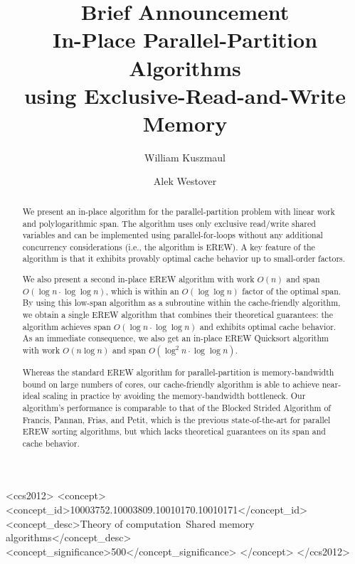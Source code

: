 \documentclass[sigconf]{acmart}
\theoremstyle{remark}
\theoremstyle{remark}
\begin{document}
\fancyhead{}


\title{Brief Announcement \\In-Place Parallel-Partition Algorithms \\using Exclusive-Read-and-Write Memory}

\author{William Kuszmaul}

\author{Alek Westover}

\renewcommand{\shortauthors}{William Kuszmaul and Alek Westover}

\begin{abstract}
We present an in-place algorithm for the parallel-partition problem
with linear work and polylogarithmic span. The algorithm uses only
exclusive read/write shared variables and can be implemented using
parallel-for-loops without any additional concurrency considerations
(i.e., the algorithm is EREW). A key feature of the algorithm is that
it exhibits provably optimal cache behavior up to small-order factors.

We also present a second in-place EREW algorithm with work $O(n)$ and span
$O(\log n \cdot \log \log n)$, which is within an $O(\log\log n)$ factor of the
optimal span. By using this low-span algorithm as a subroutine within the
cache-friendly algorithm, we obtain a single EREW algorithm that combines their
theoretical guarantees: the algorithm achieves span $O(\log n \cdot \log \log
n)$ and exhibits optimal cache behavior. As an immediate consequence, we also
get an in-place EREW Quicksort algorithm with work $O(n \log n)$ and span
$O(\log^2 n \cdot \log \log n)$.

Whereas the standard EREW algorithm for parallel-partition is
memory-bandwidth bound on large numbers of cores, our cache-friendly
algorithm is able to achieve near-ideal scaling in practice by
avoiding the memory-bandwidth bottleneck. Our algorithm's performance
is comparable to that of the Blocked Strided Algorithm of Francis,
Pannan, Frias, and Petit, which is the previous state-of-the-art for
parallel EREW sorting algorithms, but which lacks theoretical
guarantees on its span and cache behavior.
\end{abstract}

\begin{CCSXML}
<ccs2012>
   <concept>
       <concept_id>10003752.10003809.10010170.10010171</concept_id>
       <concept_desc>Theory of computation~Shared memory algorithms</concept_desc>
       <concept_significance>500</concept_significance>
       </concept>
 </ccs2012>
\end{CCSXML}
\end{document}
